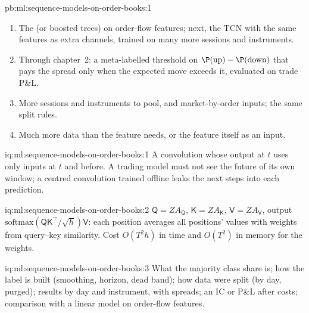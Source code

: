 \begin{solution}{pb:ml:sequence-models-on-order-books:1}
\begin{enumerate}
{regression}'s 0.543 and 0.781, with standard deviations across sessions and seeds of 0.15 against 0.09: a gain of $-0.12$
of IC, the gap narrowing as sessions are added.
\item The  (or boosted trees) on order-flow features; next, the TCN with the same features as extra
channels, trained on many more sessions and instruments.
\item Through chapter~2: a meta-labelled threshold on $\P(\text{up}) - \P(\text{down})$ that pays the spread only when the
expected move exceeds it, evaluated on trade P\&L.
\item More sessions and instruments to pool, and market-by-order inputs; the same split rules.
\item Much more data than the feature needs, or the feature itself as an input.
\end{enumerate}
\end{solution}

\begin{solution}{iq:ml:sequence-models-on-order-books:1}
A convolution whose output at $t$ uses only inputs at $t$ and before. A trading model must not see the future of its own
window; a centred convolution trained offline leaks the next steps into each prediction.
\end{solution}

\begin{solution}{iq:ml:sequence-models-on-order-books:2}
$\mathsf Q = ZA_{\mathsf Q}$, $\mathsf K = ZA_{\mathsf K}$, $\mathsf V = ZA_{\mathsf V}$, output $\mathrm{softmax}(\mathsf
Q\mathsf K^\top/\sqrt h)\mathsf V$: each position averages all positions' values with weights from query--key similarity.
Cost $O(T^2h)$ in time and $O(T^2)$ in memory for the weights.
\end{solution}

\begin{solution}{iq:ml:sequence-models-on-order-books:3}
What the majority class share is; how the label is built (smoothing, horizon, dead band); how data were split (by day,
purged); results by day and instrument, with spreads; an IC or P\&L after costs; comparison with a linear model on
order-flow features.
\end{solution}

